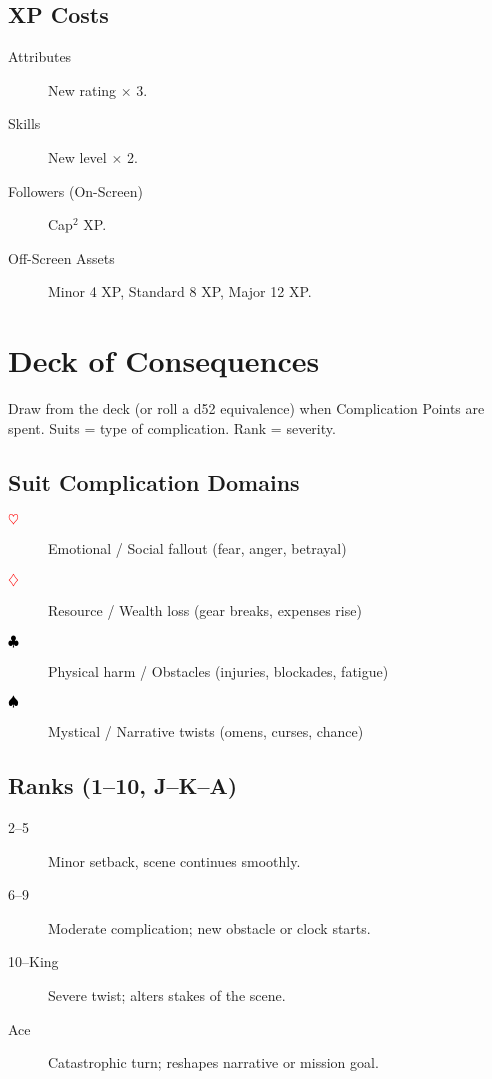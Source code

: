 \subsection{XP Costs}

\begin{description}
\item[Attributes] New rating $\times$ 3.
\item[Skills] New level $\times$ 2.
\item[Followers (On-Screen)] Cap$^2$ XP.
\item[Off-Screen Assets] Minor 4 XP, Standard 8 XP, Major 12 XP.
\end{description}

\section{Deck of Consequences}

Draw from the deck (or roll a d52 equivalence) when Complication Points are spent. Suits = type of complication. Rank = severity.

\subsection{Suit Complication Domains}

\begin{description}
\item[\textcolor{red}{$\heartsuit$}] Emotional / Social fallout (fear, anger, betrayal)
\item[\textcolor{red}{$\diamondsuit$}] Resource / Wealth loss (gear breaks, expenses rise)
\item[\textcolor{black}{$\clubsuit$}] Physical harm / Obstacles (injuries, blockades, fatigue)
\item[\textcolor{black}{$\spadesuit$}] Mystical / Narrative twists (omens, curses, chance)
\end{description}

\subsection{Ranks (1--10, J--K--A)}

\begin{description}
\item[2--5] Minor setback, scene continues smoothly.
\item[6--9] Moderate complication; new obstacle or clock starts.
\item[10--King] Severe twist; alters stakes of the scene.
\item[Ace] Catastrophic turn; reshapes narrative or mission goal.
\end{description}

